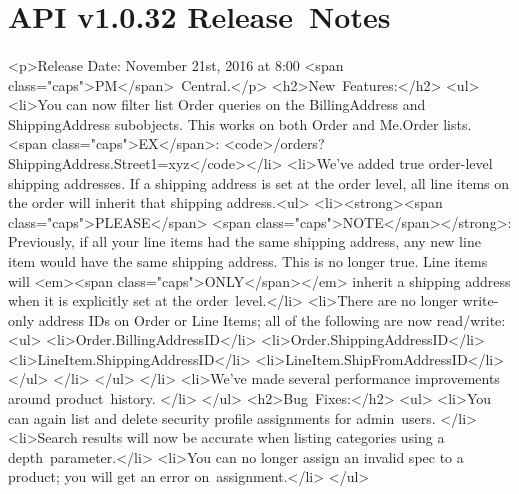 \documentclass{memoir}%
\begin{document}
%
\section*{API v1.0.32 Release~Notes}%
\paragraph*{}%

%
\paragraph*{}%
<p>Release Date: November 21st, 2016 at 8:00 <span class="caps">PM</span>~Central.</p>\newline%
<h2>New~Features:</h2>\newline%
<ul>\newline%
<li>You can now filter list Order queries on the BillingAddress and ShippingAddress subobjects. This works on both Order and Me.Order lists. <span class="caps">EX</span>:  <code>/orders?ShippingAddress.Street1=xyz</code></li>\newline%
<li>We’ve added true order{-}level shipping addresses. If a shipping address is set at the order level, all line items on the order will inherit that shipping address.<ul>\newline%
<li><strong><span class="caps">PLEASE</span> <span class="caps">NOTE</span></strong>: Previously, if all your line items had the same shipping address, any new line item would have the same shipping address. This is no longer true. Line items will <em><span class="caps">ONLY</span></em> inherit a shipping address when it is explicitly set at the order~level.</li>\newline%
<li>There are no longer write{-}only address IDs on Order or Line Items; all of the following are now read/write:<ul>\newline%
<li>Order.BillingAddressID</li>\newline%
<li>Order.ShippingAddressID</li>\newline%
<li>LineItem.ShippingAddressID</li>\newline%
<li>LineItem.ShipFromAddressID</li>\newline%
</ul>\newline%
</li>\newline%
</ul>\newline%
</li>\newline%
<li>We’ve made several performance improvements around product~history. </li>\newline%
</ul>\newline%
<h2>Bug~Fixes:</h2>\newline%
<ul>\newline%
<li>You can again list and delete security profile assignments for admin~users. </li>\newline%
<li>Search results will now be accurate when listing categories using a depth~parameter.</li>\newline%
<li>You can no longer assign an invalid spec to a product; you will get an error on~assignment.</li>\newline%
</ul>
\end{document}
